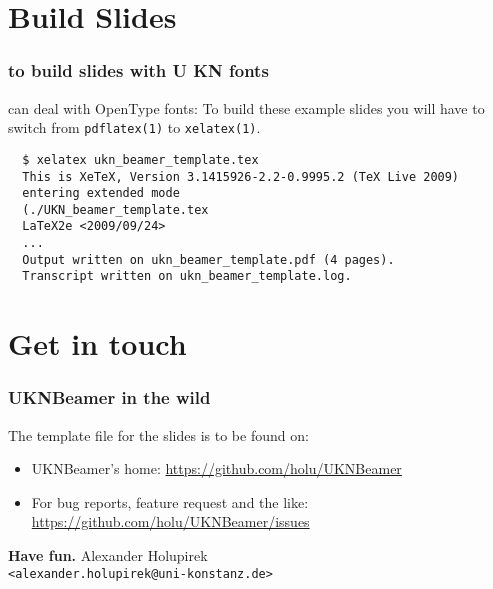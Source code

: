 \documentclass{beamer}
\begin{document}
\section{Build Slides}

\begin{frame}[fragile]
  \frametitle{\textrm{\XeTeX} to build slides with U KN fonts}

  \begin{block}{\textrm{\XeTeX} can deal with OpenType fonts:}
  To build these example slides you will have to switch from
  \texttt{pdflatex(1)} to \texttt{xelatex(1)}.
  \begin{lstlisting}
  $ xelatex ukn_beamer_template.tex
  This is XeTeX, Version 3.1415926-2.2-0.9995.2 (TeX Live 2009)
  entering extended mode
  (./UKN_beamer_template.tex
  LaTeX2e <2009/09/24>
  ...
  Output written on ukn_beamer_template.pdf (4 pages).
  Transcript written on ukn_beamer_template.log.
  \end{lstlisting}
  \end{block}

\end{frame}

\section{Get in touch}

\begin{frame}
  \frametitle{UKNBeamer in the wild}

  \begin{block}{The template file for the slides is to be found on:}
    \begin{itemize}
      \item UKNBeamer's home:
            \url{https://github.com/holu/UKNBeamer}
      \item For bug reports, feature request and the like:\\
            \url{https://github.com/holu/UKNBeamer/issues}
    \end{itemize}
  \end{block}

  \vskip0.25cm

  \textbf{Have fun.}
  \vskip0.25cm
  \hskip0.75cm
  Alexander Holupirek\\
  \hskip0.75cm
  \texttt{\scriptsize<alexander.holupirek@uni-konstanz.de>}
\end{frame}
\end{document}
